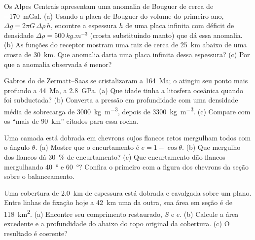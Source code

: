 \begin{exercise}[$\star\star$]\label{exo:b2:alpine-orogen:5}
Os Alpes Centrais apresentam uma anomalia de Bouguer de cerca de \qty{-170}{mGal}. (a) Usando a placa
de Bouguer do volume do primeiro ano, $\Delta g = 2\pi G\,\Delta\rho\,h$, encontre a espessura $h$ de uma
placa infinita com déficit de densidade $\Delta\rho = \qty{500}{kg.m^{-3}}$ (crosta substituindo manto)
que dá essa anomalia. (b) As funções do receptor mostram uma raiz de cerca de \qty{25}{km} abaixo de uma
crosta de \qty{30}{km}. Que anomalia daria uma placa infinita dessa espessura? (c) Por que a
anomalia observada é menor?
\end{exercise}

\begin{exercise}[$\star\star$]\label{exo:b2:alpine-orogen:6}
Gabros do  de Zermatt--Saas se cristalizaram a \qty{164}{Ma}; o  atingiu
seu ponto mais profundo a \qty{44}{Ma}, a \qty{2.8}{GPa}. (a) Que idade tinha a litosfera
oceânica quando foi subductada? (b) Converta a pressão em profundidade com uma densidade média de
sobrecarga de \qty{3000}{kg.m^{-3}}, depois de \qty{3300}{kg.m^{-3}}. (c) Compare com os
``mais de \qty{90}{km}'' citados para essa rocha.
\end{exercise}

\begin{exercise}[$\star\star$]\label{exo:b2:alpine-orogen:7}
Uma camada está dobrada em chevrons cujos flancos retos mergulham todos com o ângulo $\theta$.
(a) Mostre que o encurtamento é $e = 1 - \cos\theta$. (b) Que mergulho dos flancos dá
\qty{30}{\percent} de encurtamento? (c) Que encurtamento dão flancos mergulhando \qty{40}{\degree} e
\qty{60}{\degree}? Confira o primeiro com a figura dos chevrons da seção sobre o balanceamento.
\end{exercise}

\begin{exercise}[$\star\star$]\label{exo:b2:alpine-orogen:8}
Uma cobertura de \qty{2.0}{km} de espessura está dobrada e cavalgada sobre um  plano. Entre linhas de fixação
hoje a \qty{42}{km} uma da outra, sua área em seção é de \qty{118}{km^2}. (a) Encontre seu comprimento
restaurado, $S$ e $e$. (b) Calcule a área excedente e a profundidade do  abaixo do
topo original da cobertura. (c) O resultado é coerente?
\end{exercise}

